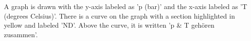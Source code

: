 A graph is drawn with the y-axis labeled as 'p (bar)' and the x-axis labeled as 'T (degrees Celsius)'. There is a curve on the graph with a section highlighted in yellow and labeled 'ND'. Above the curve, it is written 'p & T gehören zusammen'.